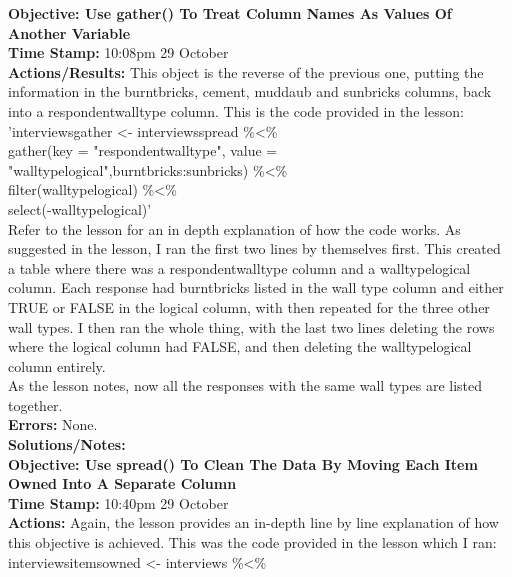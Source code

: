 \documentclass{article}
\begin{document}
\begin{FlushLeft}
\vspace{5mm}
\textbf{Objective: Use gather() To Treat Column Names As Values Of Another Variable}\\ 
\textbf{Time Stamp:} 10:08pm 29 October\\
\textbf{Actions/Results:} This object is the reverse of the previous one, putting the information in the burntbricks, cement, muddaub and sunbricks columns, back into a respondent\textunderscore wall\textunderscore type column. This is the code provided in the lesson:\\
'interviews\textunderscore gather \textless - interviews\textunderscore spread \%\textless\%\\
gather(key = "respondent\textunderscore wall\textunderscore type", value = "wall\textunderscore type\textunderscore logical",burntbricks:sunbricks) \%\textless\%\\
filter(wall\textunderscore type\textunderscore logical) \%\textless\%\\
select(-wall\textunderscore type\textunderscore logical)'\\
Refer to the lesson for an in depth explanation of how the code works. As suggested in the lesson, I ran the first two lines by themselves first. This created a table where there was a respondent\textunderscore wall\textunderscore type column and a wall\textunderscore type\textunderscore logical column. Each response had burntbricks listed in the wall type column and either TRUE or FALSE in the logical column, with then repeated for the three other wall types. I then ran the whole thing, with the last two lines deleting the rows where the logical column had FALSE, and then deleting the wall\textunderscore type\textunderscore logical column entirely.\\
As the lesson notes, now all the responses with the same wall types are listed together.\\
\textbf{Errors:} None.\\
\textbf{Solutions/Notes:}\\
\vspace{5mm}
\textbf{Objective: Use spread() To Clean The Data By Moving Each Item Owned Into A Separate Column}\\ 
\textbf{Time Stamp:} 10:40pm 29 October\\
\textbf{Actions:} Again, the lesson provides an in-depth line by line explanation of how this objective is achieved. This was the code provided in the lesson which I ran:
interviews\textunderscore items\textunderscore owned \textless - interviews \%\textless\%\\

\end{FlushLeft}
\end{document}
